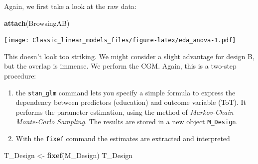 \documentclass[]{svmono}
\newenvironment{Shaded}{\begin{snugshade}}{\end{snugshade}}
\newcommand{\KeywordTok}[1]{\textcolor[rgb]{0.13,0.29,0.53}{\textbf{#1}}}
\newcommand{\DataTypeTok}[1]{\textcolor[rgb]{0.13,0.29,0.53}{#1}}
\newcommand{\DecValTok}[1]{\textcolor[rgb]{0.00,0.00,0.81}{#1}}
\newcommand{\StringTok}[1]{\textcolor[rgb]{0.31,0.60,0.02}{#1}}
\newcommand{\OperatorTok}[1]{\textcolor[rgb]{0.81,0.36,0.00}{\textbf{#1}}}
\newcommand{\NormalTok}[1]{#1}
\providecommand{\tightlist}{%
  \setlength{\itemsep}{0pt}\setlength{\parskip}{0pt}}
\theoremstyle{definition}
\theoremstyle{definition}
\theoremstyle{definition}
\theoremstyle{remark}
\begin{document}
Again, we first take a look at the raw data:

\begin{Shaded}
\begin{Highlighting}[]
\KeywordTok{attach}\NormalTok{(BrowsingAB)}
\end{Highlighting}
\end{Shaded}

\begin{Shaded}
\end{Shaded}

\texttt{[image: Classic\_linear\_models\_files/figure-latex/eda\_anova-1.pdf]}

This doesn't look too striking. We might consider a slight advantage for
design B, but the overlap is immense. We perform the CGM. Again, this is
a two-step procedure:

\begin{enumerate}
\def\labelenumi{\arabic{enumi}.}
\tightlist
\item
  the \texttt{stan\_glm} command lets you specify a simple formula to
  express the dependency between predictors (education) and outcome
  variable (ToT). It performs the parameter estimation, using the method
  of \emph{Markov-Chain Monte-Carlo Sampling}. The results are stored in
  a new object \texttt{M\_Design}.
\item
  With the \texttt{fixef} command the estimates are extracted and
  interpreted
\end{enumerate}

\begin{Shaded}
\end{Shaded}

\begin{Shaded}
\begin{Highlighting}[]
\NormalTok{T_Design <-}\StringTok{ }\KeywordTok{fixef}\NormalTok{(M_Design)}
\NormalTok{T_Design}
\end{Highlighting}
\end{Shaded}
\end{document}
